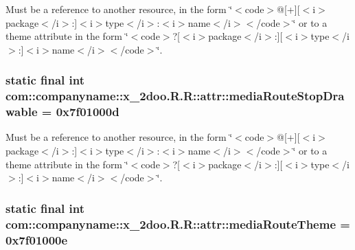 Must be a reference to another resource, in the form \char`\"{}$<$code$>$@\mbox{[}+\mbox{]}\mbox{[}$<$i$>$package$<$/i$>$:\mbox{]}$<$i$>$type$<$/i$>$:$<$i$>$name$<$/i$>$$<$/code$>$\char`\"{} or to a theme attribute in the form \char`\"{}$<$code$>$?\mbox{[}$<$i$>$package$<$/i$>$:\mbox{]}\mbox{[}$<$i$>$type$<$/i$>$:\mbox{]}$<$i$>$name$<$/i$>$$<$/code$>$\char`\"{}. \hypertarget{classcom_1_1companyname_1_1x__2doo_1_1_r_1_1attr_a75d4317c5e1a238df60d7fb52a4e959}{
\subsubsection[{mediaRouteStopDrawable}]{\setlength{\rightskip}{0pt plus 5cm}static final int com::companyname::x\_\-2doo.R.R::attr::mediaRouteStopDrawable = 0x7f01000d}}
\label{classcom_1_1companyname_1_1x__2doo_1_1_r_1_1attr_a75d4317c5e1a238df60d7fb52a4e959}


Must be a reference to another resource, in the form \char`\"{}$<$code$>$@\mbox{[}+\mbox{]}\mbox{[}$<$i$>$package$<$/i$>$:\mbox{]}$<$i$>$type$<$/i$>$:$<$i$>$name$<$/i$>$$<$/code$>$\char`\"{} or to a theme attribute in the form \char`\"{}$<$code$>$?\mbox{[}$<$i$>$package$<$/i$>$:\mbox{]}\mbox{[}$<$i$>$type$<$/i$>$:\mbox{]}$<$i$>$name$<$/i$>$$<$/code$>$\char`\"{}. \hypertarget{classcom_1_1companyname_1_1x__2doo_1_1_r_1_1attr_a7a1a93934edf2c2788294f1ff8b81a9}{
\subsubsection[{mediaRouteTheme}]{\setlength{\rightskip}{0pt plus 5cm}static final int com::companyname::x\_\-2doo.R.R::attr::mediaRouteTheme = 0x7f01000e}}
\label{classcom_1_1companyname_1_1x__2doo_1_1_r_1_1attr_a7a1a93934edf2c2788294f1ff8b81a9}


